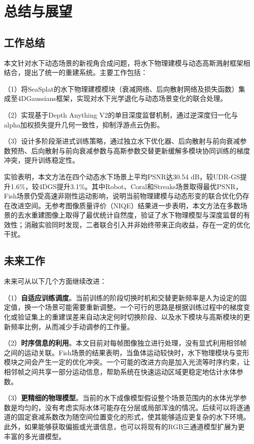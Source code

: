 \chapter{总结与展望}

\section{工作总结}

本文针对水下动态场景的新视角合成问题，将水下物理建模与动态高斯溅射框架相结合，提出了统一的重建系统。主要工作包括：

（1）将SeaSplat的水下物理建模模块（衰减网络、后向散射网络及损失函数）集成至4DGaussians框架，实现对水下光学退化与动态场景变化的联合处理。

（2）实现基于Depth Anything V2的单目深度监督机制，通过逆深度归一化与alpha加权损失提升几何一致性，抑制浮游点云伪影。

（3）设计多阶段渐进式训练策略，通过独立水下优化器、后向散射与前向衰减参数预热、后向散射与前向衰减参数与高斯参数交替更新缓解多模块协同训练的梯度冲突，提升训练稳定性。

实验表明，本文方法在四个动态水下场景上平均PSNR达30.54 dB，较UDR-GS提升1.6\%，较4DGS提升3.1\%。其中Robot、Coral和Streaks场景取得最优PSNR，Fish场景仍受高速非刚性运动影响，说明当前物理建模与动态形变的联合优化仍存在改进空间。无参考图像质量评价（NIQE）结果进一步表明，本文方法在多数场景的去水重建图像上取得了最优统计自然度，验证了水下物理模型与深度监督的有效性；消融实验同时发现，二者联合引入并非始终带来正向收益，存在一定的优化干扰。

\section{未来工作}

未来可从以下几个方面继续改进：

（1）\textbf{自适应训练调度}。当前训练的阶段切换时机和交替更新频率是人为设定的固定值，换一个场景可能需要重新调整。一个可行的思路是根据训练过程中的梯度变化或验证集上的重建误差来自动决定何时切换阶段、以及水下模块与高斯模块的更新频率比例，从而减少手动调参的工作量。

（2）\textbf{时序信息的利用}。本文目前对每帧图像独立进行处理，没有显式利用相邻帧之间的运动关联。Fish场景的结果表明，当鱼体运动较快时，水下物理模块与变形模块之间会产生一定的优化冲突。一个可能的改进方向是加入光流等时序约束，让相邻帧之间共享一部分运动信息，帮助系统在快速运动区域更稳定地估计水体参数。

（3）\textbf{更精细的物理模型}。当前的水下成像模型假设整个场景范围内的水体光学参数是均匀的，没有考虑实际水体可能存在分层或局部浑浊的情况。后续可以将逐通道的固定衰减系数改为随空间位置变化的形式，使其能够适应更复杂的水下环境。此外，如果能够获取偏振或光谱信息，也可以将现有的RGB三通道模型扩展为更丰富的多光谱模型。


